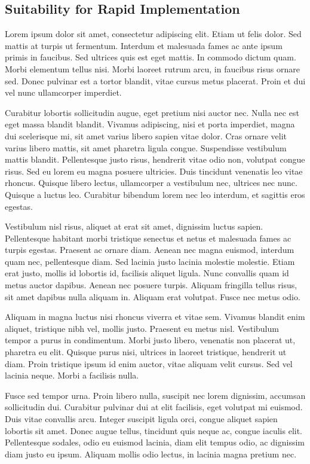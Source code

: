 \subsection{Suitability for Rapid Implementation}



Lorem ipsum dolor sit amet, consectetur adipiscing elit. Etiam ut felis dolor. Sed mattis at turpis ut fermentum. Interdum et malesuada fames ac ante ipsum primis in faucibus. Sed ultrices quis est eget mattis. In commodo dictum quam. Morbi elementum tellus nisi. Morbi laoreet rutrum arcu, in faucibus risus ornare sed. Donec pulvinar est a tortor blandit, vitae cursus metus placerat. Proin et dui vel nunc ullamcorper imperdiet.

Curabitur lobortis sollicitudin augue, eget pretium nisi auctor nec. Nulla nec est eget massa blandit blandit. Vivamus adipiscing, nisi et porta imperdiet, magna dui scelerisque mi, sit amet varius libero sapien vitae dolor. Cras ornare velit varius libero mattis, sit amet pharetra ligula congue. Suspendisse vestibulum mattis blandit. Pellentesque justo risus, hendrerit vitae odio non, volutpat congue risus. Sed eu lorem eu magna posuere ultricies. Duis tincidunt venenatis leo vitae rhoncus. Quisque libero lectus, ullamcorper a vestibulum nec, ultrices nec nunc. Quisque a luctus leo. Curabitur bibendum lorem nec leo interdum, et sagittis eros egestas.

Vestibulum nisl risus, aliquet at erat sit amet, dignissim luctus sapien. Pellentesque habitant morbi tristique senectus et netus et malesuada fames ac turpis egestas. Praesent ac ornare diam. Aenean nec magna euismod, interdum quam nec, pellentesque diam. Sed lacinia justo lacinia molestie molestie. Etiam erat justo, mollis id lobortis id, facilisis aliquet ligula. Nunc convallis quam id metus auctor dapibus. Aenean nec posuere turpis. Aliquam fringilla tellus risus, sit amet dapibus nulla aliquam in. Aliquam erat volutpat. Fusce nec metus odio.

Aliquam in magna luctus nisi rhoncus viverra et vitae sem. Vivamus blandit enim aliquet, tristique nibh vel, mollis justo. Praesent eu metus nisl. Vestibulum tempor a purus in condimentum. Morbi justo libero, venenatis non placerat ut, pharetra eu elit. Quisque purus nisi, ultrices in laoreet tristique, hendrerit ut diam. Proin tristique ipsum id enim auctor, vitae aliquam velit cursus. Sed vel lacinia neque. Morbi a facilisis nulla.

Fusce sed tempor urna. Proin libero nulla, suscipit nec lorem dignissim, accumsan sollicitudin dui. Curabitur pulvinar dui at elit facilisis, eget volutpat mi euismod. Duis vitae convallis arcu. Integer suscipit ligula orci, congue aliquet sapien lobortis sit amet. Donec augue tellus, tincidunt quis neque ac, congue iaculis elit. Pellentesque sodales, odio eu euismod lacinia, diam elit tempus odio, ac dignissim diam justo eu ipsum. Aliquam mollis odio lectus, in lacinia magna pretium nec.


